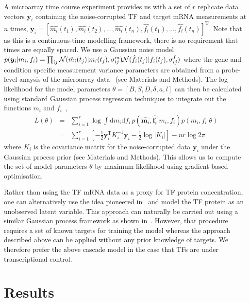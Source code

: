\documentclass{pnastwo}
\begin{document}
\begin{article}
A microarray time course experiment provides us with a set of $r$
replicate data vectors $\bm y_i$ containing the noise-corrupted TF and target mRNA
measurements at $n$ times,
$\bm y_i=[\hat{m_i}(t_1),\hat{m_i}(t_2),\ldots,\hat{m_i}(t_n),\hat{f_i}(t_1),\ldots,\hat{f_i}(t_n)]^\mathrm{T}$. Note
that as this is a continuous-time modelling framework, there is no
requirement that times are equally spaced. We use a Gaussian noise model
$p(\bm y_i|m_i,f_i)=\prod_{ij}{\cal
  N}(\hat{m_i}(t_j)|m_i(t_j),\sigma^m_{ij}){\cal
  N}(\hat{f_i}(t_j)|f_i(t_j),\sigma^f_{ij})$ where the gene and condition
specific measurement variance parameters are obtained from a probe-level anaysis of the microarray data~\cite{Liu2005,Pearson2009} (see
Materials and Methods). The log-likelihood for the model parameters
$\theta=[B,S,D,\delta,a,l]$ can then be calculated using standard Gaussian process regression
techniques to integrate out the functions $m_i$ and $f_i$~\cite{Rasmussen2006},
\begin{eqnarray*}
L(\theta) & = & \sum_{i=1}^r \log \!\int \!\mathrm{d}m_i\mathrm{d}f_i\,
p(\hat{\bm m_i}, \hat{\bm f_i}|m_i,f_i)p(m_i,f_i|\theta)  \\
& = & \sum_{i=1}^r \left[-\frac{1}{2}\bm y_i^\mathrm{T} K_i^{-1} \bm y_i -
\frac{1}{2}\log|K_i|\right] -nr\log 2\pi
\end{eqnarray*}
where $K_i$ is the covariance matrix for the
noise-corrupted data $\bm y_i$ under the Gaussian process prior (see
Materials and Methods). This allows us to compute the set of model
parameters $\theta$ by maximum
likelihood using gradient-based optimisation. 

Rather than using the TF mRNA data as a proxy for TF protein concentration,
one can alternatively use the idea pioneered
in~\cite{Barenco2006a} and model the TF protein as an unobserved
latent variable. This approach can naturally be carried out using a
similar Gaussian process framework as shown in~\cite{Gao2008}. However, that procedure requires a set of known
targets for training the model whereas the approach described above
can be applied without any prior knowledge of targets. We therefore
prefer the above cascade model in the case that TFs are under
transcriptional control. 

\section{Results}


\end{article}
\end{document}
